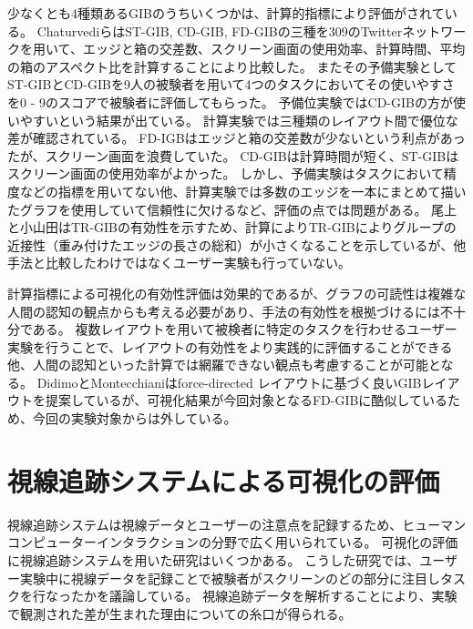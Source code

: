 \documentclass{kuee}
\begin{document}
少なくとも4種類あるGIBのうちいくつかは、計算的指標により評価がされている。
ChaturvediらはST-GIB, CD-GIB, FD-GIBの三種を309のTwitterネットワークを用いて、エッジと箱の交差数、スクリーン画面の使用効率、計算時間、平均の箱のアスペクト比を計算することにより比較した\cite{chaturvedi2014group}。
またその予備実験としてST-GIBとCD-GIBを9人の被験者を用いて4つのタスクにおいてその使いやすさを0 - 9のスコアで被験者に評価してもらった。
予備位実験ではCD-GIBの方が使いやすいという結果が出ている。
計算実験では三種類のレイアウト間で優位な差が確認されている。
FD-IGBはエッジと箱の交差数が少ないという利点があったが、スクリーン画面を浪費していた。
CD-GIBは計算時間が短く、ST-GIBはスクリーン画面の使用効率がよかった。
しかし、予備実験はタスクにおいて精度などの指標を用いてない他、計算実験では多数のエッジを一本にまとめて描いたグラフを使用していて信頼性に欠けるなど、評価の点では問題がある。
尾上と小山田はTR-GIBの有効性を示すため、計算によりTR-GIBによりグループの近接性（重み付けたエッジの長さの総和）が小さくなることを示しているが、他手法と比較したわけではなくユーザー実験も行っていない\cite{onoue2017optimal}。

計算指標による可視化の有効性評価は効果的であるが、グラフの可読性は複雑な人間の認知の観点からも考える必要があり、手法の有効性を根拠づけるには不十分である。
複数レイアウトを用いて被検者に特定のタスクを行わせるユーザー実験を行うことで、レイアウトの有効性をより実践的に評価することができる他、人間の認知といった計算では網羅できない観点も考慮することが可能となる。
DidimoとMontecchianiはforce-directed レイアウトに基づく良いGIBレイアウトを提案しているが\cite{6295786}、可視化結果が今回対象となるFD-GIBに酷似しているため、今回の実験対象からは外している。


\section{視線追跡システムによる可視化の評価}
\label{sec:evaluation_with_eyetracking}
視線追跡システムは視線データとユーザーの注意点を記録するため、ヒューマンコンピューターインタラクションの分野で広く用いられている\cite{andrienko2012visual,duchowski2007eye,kurzhals2014evaluating}。
可視化の評価に視線追跡システムを用いた研究はいくつかある\cite{burch2011evaluation',pohl2009comparing,netzel2014comparative,jianu2014display,7539393}。
こうした研究では、ユーザー実験中に視線データを記録ことで被験者がスクリーンのどの部分に注目しタスクを行なったかを議論している。
視線追跡データを解析することにより、実験で観測された差が生まれた理由についての糸口が得られる。
\end{document}
